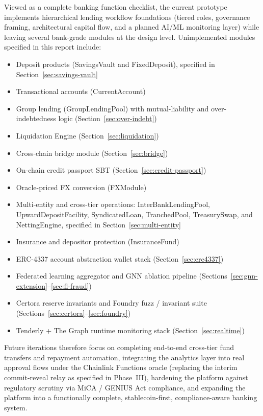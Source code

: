 \documentclass[12pt,a4paper]{report}
\begin{document}
Viewed as a complete banking function checklist, the current prototype implements hierarchical lending workflow foundations (tiered roles, governance framing, architectural capital flow, and a planned AI/ML monitoring layer) while leaving several bank-grade modules at the design level. Unimplemented modules specified in this report include:
\begin{itemize}[noitemsep]
\item Deposit products (SavingsVault and FixedDeposit), specified in Section~\ref{sec:savings-vault}
\item Transactional accounts (CurrentAccount)
\item Group lending (GroupLendingPool) with mutual-liability and over-indebtedness logic (Section~\ref{sec:over-indebt})
\item Liquidation Engine (Section~\ref{sec:liquidation})
\item Cross-chain bridge module (Section~\ref{sec:bridge})
\item On-chain credit passport SBT (Section~\ref{sec:credit-passport})
\item Oracle-priced FX conversion (FXModule)
\item Multi-entity and cross-tier operations: InterBankLendingPool, UpwardDepositFacility, SyndicatedLoan, TranchedPool, TreasurySwap, and NettingEngine, specified in Section~\ref{sec:multi-entity}
\item Insurance and depositor protection (InsuranceFund)
\item ERC-4337 account abstraction wallet stack (Section~\ref{sec:erc4337})
\item Federated learning aggregator and GNN ablation pipeline (Sections~\ref{sec:gnn-extension}--\ref{sec:fl-fraud})
\item Certora reserve invariants and Foundry fuzz / invariant suite (Sections~\ref{sec:certora}--\ref{sec:foundry})
\item Tenderly + The Graph runtime monitoring stack (Section~\ref{sec:realtime})
\end{itemize}
Future iterations therefore focus on completing end-to-end cross-tier fund transfers and repayment automation, integrating the analytics layer into real approval flows under the Chainlink Functions oracle (replacing the interim commit-reveal relay as specified in Phase~III), hardening the platform against regulatory scrutiny via MiCA / GENIUS Act compliance, and expanding the platform into a functionally complete, stablecoin-first, compliance-aware banking system.
\end{document}
